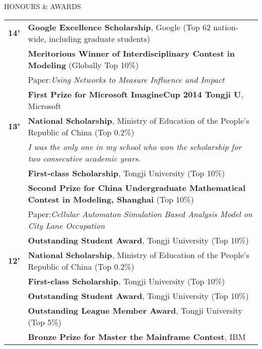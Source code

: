 \documentclass{resume} %
\begin{document}
\begin{rSection}{HONOURS \& AWARDS}

  \begin{tabular}{ @{} >{\bfseries}l @{\hspace{3ex}} l }
    14' & {\bf Google Excellence Scholarship}, Google (Top 62 nation-wide, including graduate students)     \\
        & {\bf Meritorious Winner of Interdisciplinary Contest in Modeling} (Globally Top 10\%)       \\
    & {\space\space\space\space Paper}:{\em \space Using Networks to Measure Influence and Impact}               \\
        & {\bf First Prize for Microsoft ImagineCup 2014 Tongji U}, Microsoft                               \\
    13' & {\bf National Scholarship}, Ministry of Education of the People’s Republic of China (Top 0.2\%)   \\
        & {\em \space\space\space\space I was the only one in my school who won the scholarship for two consecutive academic years.} \\
        & {\bf First-class Scholarship}, Tongji University (Top 10\%)                                       \\
        & {\bf Second Prize for China Undergraduate Mathematical Contest in Modeling, Shanghai} (Top 10\%) \\
    & {\space\space\space\space Paper}:{\em \space Cellular Automaton Simulation Based Analysis Model
  on City Lane Occupation}\\
        & {\bf Outstanding Student Award}, Tongji University (Top 10\%)                                     \\
    12' & {\bf National Scholarship}, Ministry of Education of the People’s Republic of China (Top 0.2\%)   \\
        & {\bf First-class Scholarship}, Tongji University (Top 10\%)                                       \\
        & {\bf Outstanding Student Award}, Tongji University (Top 10\%)                                     \\
        & {\bf Outstanding League Member Award}, Tongji University (Top 5\%)                                \\
        & {\bf Bronze Prize for Master the Mainframe Contest}, IBM                                          \\
  \end{tabular}

\end{rSection}
\end{document}
